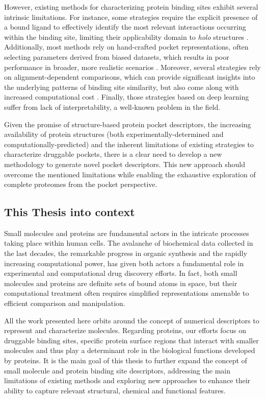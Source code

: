 However, existing methods for characterizing protein binding sites exhibit several intrinsic limitations. For instance, some strategies require the explicit presence of a bound ligand to effectively identify the most relevant interactions occurring within the binding site, limiting their applicability domain to \textit{holo} structures \cite{wood_pharmacophore_2012, desaphy_encoding_2013}. Additionally, most methods rely on hand-crafted pocket representations, often selecting parameters derived from biased datasets, which results in poor performance in broader, more realistic scenarios \cite{ehrt_benchmark_2018}. Moreover, several strategies rely on alignment-dependent comparisons, which can provide significant insights into the underlying patterns of binding site similarity, but also come along with increased computational cost \cite{schalon_simple_2008}. Finally, those strategies based on deep learning suffer from lack of interpretability, a well-known problem in the field\cite{jimenez-luna_artificial_2021, vamathevan_applications_2019, ching_opportunities_2018}.

Given the promise of structure-based protein pocket descriptors, the increasing availability of protein structures (both experimentally-determined and computationally-predicted) and the inherent limitations of existing strategies to characterize druggable pockets, there is a clear need to develop a new methodology to generate novel pocket descriptors. This new approach should overcome the mentioned limitations while enabling the exhaustive exploration of complete proteomes from the pocket perspective.  


\subsection{This Thesis into context}
\label{Introduction_context}

Small molecules and proteins are fundamental actors in the intricate processes taking place within human cells. The avalanche of biochemical data collected in the last decades, the remarkable progress in organic synthesis and the rapidly increasing computational power, has given both actors a fundamental role in experimental and computational drug discovery efforts. In fact, both small molecules and proteins are definite sets of bound atoms in space, but their computational treatment often requires simplified representations amenable to efficient comparison and manipulation. 

All the work presented here orbits around the concept of numerical descriptors to represent and characterize molecules. Regarding proteins, our efforts focus on druggable binding sites, specific protein surface regions that interact with smaller molecules and thus play a determinant role in the biological functions developed by proteins. It is the main goal of this thesis to further expand the concept of small molecule and protein binding site descriptors, addressing the main limitations of existing methods and exploring new approaches to enhance their ability to capture relevant structural, chemical and functional features. 

